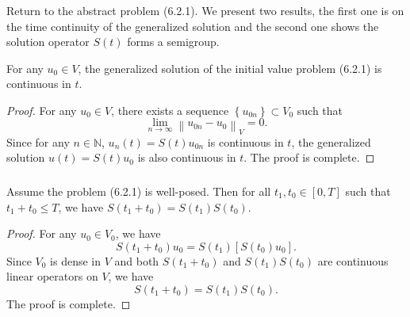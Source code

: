 \begin{frame}
	\frametitle{\insertsection}

	Return to the abstract problem (6.2.1).
	We present two results, the first one is on the time continuity of the
	generalized solution and the second one shows the solution operator
	$S\left(t\right)$ forms a semigroup.

	\begin{proposition}
		For any $u_{0}\in V$, the generalized solution of the initial value problem (6.2.1) is continuous in $t$.
	\end{proposition}
	\begin{proof}
		For any $u_{0}\in V$, there exists a sequence $\left\{u_{0n}\right\}\subset V_{0}$ such that
		\begin{equation*}
			\lim_{n\to\infty}
			{\left\|
				u_{0n}-
				u_{0}
				\right\|}_{V}=0.
		\end{equation*}
		Since for any $n\in\mathbb{N}$, $u_{n}\left(t\right)=S\left(t\right)u_{0n}$ is continuous in $t$,
		the generalized solution $u\left(t\right)=S\left(t\right)u_{0}$ is also continuous in $t$.
		The proof is complete.
	\end{proof}
\end{frame}

\begin{frame}
	\frametitle{\insertsection}

	\begin{proposition}
		Assume the problem (6.2.1) is well-posed.
		Then for all $t_{1},t_{0}\in\left[0,T\right]$ such that
		$t_{1}+t_{0}\leq T$, we have $S\left(t_{1}+t_{0}\right)=S\left(t_{1}\right)S\left(t_{0}\right)$.
	\end{proposition}

	\begin{proof}
		For any $u_{0}\in V_{0}$, we have
		\begin{equation*}
			S\left(t_{1}+t_{0}\right)u_{0}=
			S\left(t_{1}\right)
			\left[
				S\left(t_{0}\right)u_{0}
				\right].
		\end{equation*}
		Since $V_{0}$ is dense in $V$ and both $S\left(t_{1}+t_{0}\right)$ and $S\left(t_{1}\right)S\left(t_{0}\right)$ are continuous linear operators on $V$, we have
		\begin{equation*}
			S\left(t_{1}+t_{0}\right)=
			S\left(t_{1}\right)
			S\left(t_{0}\right).
		\end{equation*}
		The proof is complete.
	\end{proof}
\end{frame}

